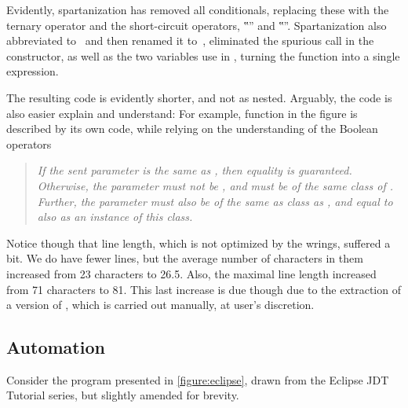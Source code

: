 Evidently, spartanization has removed all conditionals, replacing these with
the ternary operator and the short-circuit operators, ‟\cc{\textbar\textbar}”
and ‟”. Spartanization also abbreviated  to~ and then
renamed it to~, eliminated the spurious  call in the
constructor, as well as the two variables use in , turning the
function into a single expression.

The resulting code is evidently shorter, and not as nested. Arguably, the code
is also easier explain and understand: For example, function  in the figure is described by its own code, while relying on the
understanding of the Boolean operators

\begin{quote}\itshape\scriptsize
  If the sent parameter is the same as , then equality is guaranteed.
  Otherwise, the parameter must not be , and must be of the same class
  of . Further, the parameter must also be of the same as class as
  , and equal to  also as an instance of this class.
\end{quote}

Notice though that line length, which is not optimized by the wrings, suffered
a bit. We do have fewer lines, but the average number of characters in them
increased from 23 characters to 26.5. Also, the maximal line length increased
from 71 characters to 81. This last increase is due though due to the
extraction of a  version of , which is carried
out manually, at user's discretion.

\subsection{Automation}
\label{section:automation}
Consider the \Java program presented in \cref{figure:eclipse}, drawn from the
Eclipse JDT Tutorial series,
but slightly amended for brevity.


